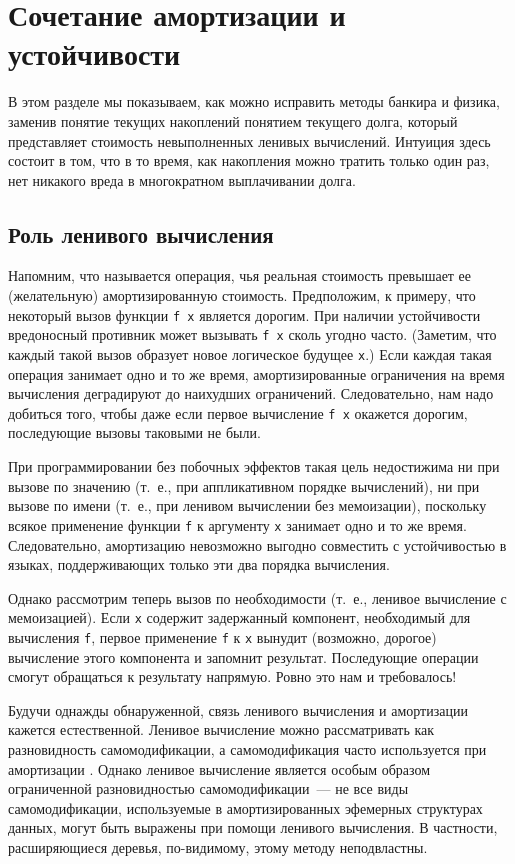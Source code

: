 \section{Сочетание амортизации и устойчивости}
\label{sc:6.2}

В этом разделе мы показываем, как можно исправить методы банкира и
физика, заменив понятие текущих накоплений понятием текущего долга,
который представляет стоимость невыполненных ленивых
вычислений. Интуиция здесь состоит в том, что в то время, как
накопления можно тратить только один раз, нет никакого вреда в
многократном выплачивании долга.

\subsection{Роль ленивого вычисления}
\label{sc:6.2.1}

Напомним, что  называется операция, чья
реальная стоимость превышает ее (желательную) амортизированную
стоимость. Предположим, к примеру, что некоторый вызов функции
\lstinline!f x!
является дорогим. При наличии устойчивости вредоносный противник может
вызывать \lstinline!f x! сколь угодно часто. (Заметим, что каждый
такой вызов образует новое логическое будущее \lstinline!x!.) Если
каждая такая операция занимает одно и то же время, амортизированные
ограничения на время вычисления деградируют до наихудших
ограничений. Следовательно, нам надо добиться того, чтобы даже если
первое вычисление \lstinline!f x! окажется дорогим, последующие вызовы
таковыми не были.

При программировании без побочных эффектов такая цель недостижима ни
при вызове по значению (т.~е., при аппликативном порядке вычислений),
ни при вызове по имени (т.~е., при ленивом вычислении без мемоизации),
поскольку всякое применение функции \lstinline!f! к аргументу
\lstinline!x! занимает одно и то же время. Следовательно, амортизацию
невозможно выгодно совместить с устойчивостью в языках, поддерживающих
только эти два порядка вычисления.

Однако рассмотрим теперь вызов по необходимости (т.~е., ленивое
вычисление с мемоизацией). Если \lstinline!x! содержит задержанный
компонент, необходимый для вычисления \lstinline!f!, первое применение
\lstinline!f! к \lstinline!x! вынудит (возможно, дорогое) вычисление
этого компонента и запомнит результат. Последующие операции смогут
обращаться к результату напрямую. Ровно это нам и требовалось!

\begin{remark}
  Будучи однажды обнаруженной, связь ленивого вычисления и амортизации
  кажется естественной. Ленивое вычисление можно рассматривать как
  разновидность самомодификации, а самомодификация часто используется
  при амортизации \cite{SleatorTarjan1985, SleatorTarjan1986b}. Однако
  ленивое вычисление является особым образом ограниченной
  разновидностью самомодификации~--- не все виды самомодификации,
  используемые в амортизированных эфемерных структурах данных, могут
  быть выражены при помощи ленивого вычисления. В частности,
  расширяющиеся деревья, по-видимому, этому методу неподвластны.
\end{remark}
